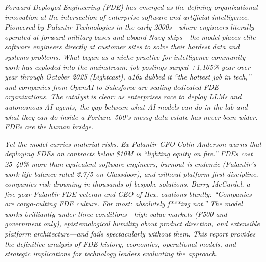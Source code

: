 \vspace{6pt}

\textit{Forward Deployed Engineering (FDE) has emerged as the defining
organizational innovation at the intersection of enterprise software and
artificial intelligence. Pioneered by Palantir Technologies in the early
2000s---where engineers literally operated at forward military bases and
aboard Navy ships---the model places elite software engineers directly at
customer sites to solve their hardest data and systems problems. What
began as a niche practice for intelligence community work has exploded
into the mainstream: job postings surged +1,165\% year-over-year through
October 2025 (Lightcast), a16z dubbed it ``the hottest job in tech,'' and
companies from OpenAI to Salesforce are scaling dedicated FDE
organizations. The catalyst is clear: as enterprises race to deploy LLMs
and autonomous AI agents, the gap between what AI models can do in the
lab and what they can do inside a Fortune~500's messy data estate has
never been wider. FDEs are the human bridge.}

\vspace{6pt}

\textit{Yet the model carries material risks. Ex-Palantir CFO Colin
Anderson warns that deploying FDEs on contracts below \$10M is ``lighting
equity on fire.'' FDEs cost 25--40\% more than equivalent software
engineers, burnout is endemic (Palantir's work-life balance rated 2.7/5
on Glassdoor), and without platform-first discipline, companies risk
drowning in thousands of bespoke solutions. Barry McCardel, a five-year
Palantir FDE veteran and CEO of Hex, cautions bluntly: ``Companies are
cargo-culting FDE culture. For most: absolutely f***ing not.'' The model
works brilliantly under three conditions---high-value markets (F500 and
government only), epistemological humility about product direction, and
extensible platform architecture---and fails spectacularly without them.
This report provides the definitive analysis of FDE history, economics,
operational models, and strategic implications for technology leaders
evaluating the approach.}

\vspace{10pt}

